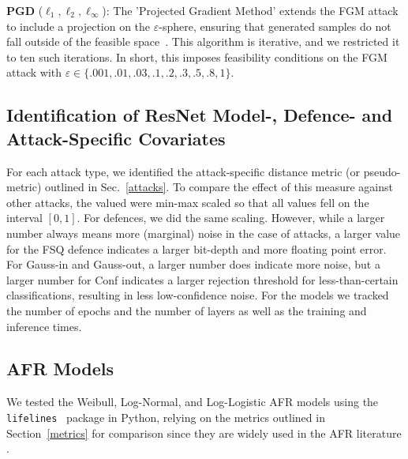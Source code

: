 \textbf{PGD}  ($\ell_1, \ell_2, \ell_{\infty}$): The 'Projected Gradient Method' extends the FGM attack to include a projection on the $\varepsilon$-sphere, ensuring that generated samples do not fall outside of the feasible space~\citep{madry2017towards}. This algorithm is iterative, and we restricted it to ten such iterations. In short, this imposes feasibility conditions on the FGM attack with $\varepsilon \in \{.001,.01,.03,.1,.2,.3,.5,.8,1\}$.

\subsection{Identification of ResNet Model-, Defence- and Attack-Specific Covariates}
For each attack type, we identified the attack-specific distance metric (or pseudo-metric) outlined in Sec.~\ref{attacks}. To compare the effect of this measure against other attacks, the valued were min-max scaled so that all values fell on the interval $[0,1]$. For defences, we did the same scaling. However, while a larger number always means more (marginal) noise in the case of attacks, a larger value for the FSQ defence indicates a larger bit-depth and more floating point error. For Gauss-in and Gauss-out, a larger number does indicate more noise, but a larger number for Conf indicates a larger rejection threshold for less-than-certain classifications, resulting in less low-confidence noise. For the models we tracked the number of epochs and the number of layers as well as the training and inference times. 


\subsection{AFR Models}
We tested the Weibull, Log-Normal, and Log-Logistic AFR models using the \texttt{lifelines}~\citep{lifelines} package in Python, relying on the metrics outlined in Section~\ref{metrics} for comparison since they are widely used in the AFR literature \citep{aft_models}.

